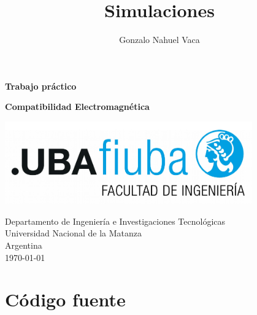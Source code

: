 \documentclass[
    11pt,
    spanish,
	a4paper
]{article}
\title{Simulaciones}
\author{Gonzalo Nahuel Vaca}
\def\doctype{Trabajo práctico}
\begin{document}
\makeatletter
\begin{titlepage}
	\begin{center}
		\vspace*{1cm}
		
		\Huge
		\textbf{\doctype}
		\vspace{0.5cm}
    
		\LARGE
		\@title
		\vspace{0.5cm}
    
		\textbf{Compatibilidad Electromagnética}
		
		\vspace{1.5cm}
		
		\textbf{\@author}

		\vspace{1.5cm}

		\includegraphics[width=0.8\textwidth]{../img/logoFIUBA.pdf}
		
		\vfill
		Departamento de Ingeniería e Investigaciones Tecnológicas\\
		Universidad Nacional de la Matanza\\
		Argentina\\
		\today
	\end{center}
\end{titlepage}
\makeatother
\newpage

\section{Código fuente}
\end{document}
